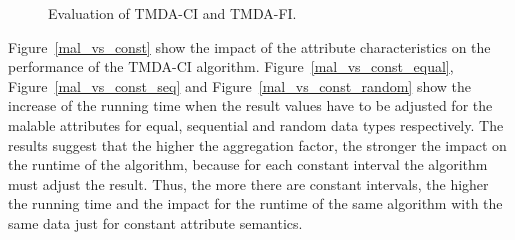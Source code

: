 \documentclass[a4paper,11pt]{article}
\begin{document}
\begin{figure}[ht!]
	\begin{center}
	\end{center}
	\caption{Evaluation of TMDA-CI and TMDA-FI.}
	\label{scalability}
\end{figure} 

Figure~\ref{mal_vs_const} show the impact of the attribute characteristics on the performance of the TMDA-CI algorithm. Figure~\ref{mal_vs_const_equal}, Figure~\ref{mal_vs_const_seq} and Figure~\ref{mal_vs_const_random} show the increase of the running time when the result values have to be adjusted for the malable attributes for equal, sequential and random data types respectively. The results suggest that the higher the aggregation factor, the stronger the impact on the runtime of the algorithm, because for each constant interval the algorithm must adjust the result. Thus, the more there are constant intervals, the higher the running time and the impact for the runtime of the same algorithm with the same data just for constant attribute semantics.
\end{document}
